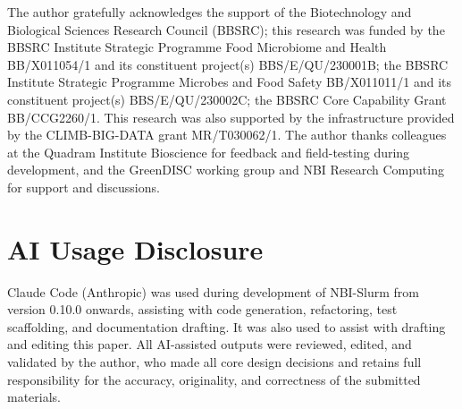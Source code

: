 \documentclass[
]{article}
\begin{document}
The author gratefully acknowledges the support of the Biotechnology and
Biological Sciences Research Council (BBSRC); this research was funded
by the BBSRC Institute Strategic Programme Food Microbiome and Health
BB/X011054/1 and its constituent project(s) BBS/E/QU/230001B; the BBSRC
Institute Strategic Programme Microbes and Food Safety BB/X011011/1 and
its constituent project(s) BBS/E/QU/230002C; the BBSRC Core Capability
Grant BB/CCG2260/1. This research was also supported by the
infrastructure provided by the CLIMB-BIG-DATA grant MR/T030062/1. The
author thanks colleagues at the Quadram Institute Bioscience for
feedback and field-testing during development, and the GreenDISC working
group and NBI Research Computing for support and discussions.

\section{AI Usage Disclosure}\label{ai-usage-disclosure}

Claude Code (Anthropic) was used during development of NBI-Slurm from
version 0.10.0 onwards, assisting with code generation, refactoring,
test scaffolding, and documentation drafting. It was also used to assist
with drafting and editing this paper. All AI-assisted outputs were
reviewed, edited, and validated by the author, who made all core design
decisions and retains full responsibility for the accuracy, originality,
and correctness of the submitted materials.

\renewcommand\refname{References}

\end{document}
